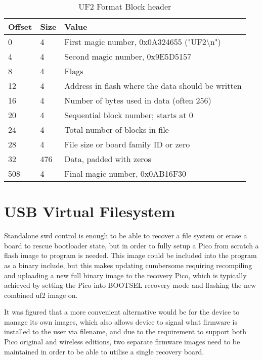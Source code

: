 {\begin{table}[h]
	\centering
	\caption{UF2 Format Block header\cite{USBFlashingFormat2023}}%
	\vspace{-16.5pt}%
	
	\begin{tabular}{|l|l|l|}
		\hline
		Offset	& Size &	Value\\ \hline
		0	& 4 &	First magic number, 0x0A324655 ("UF2\textbackslash n")\\ \hline
		4&	4&	Second magic number, 0x9E5D5157\\ \hline
		8	&4&	Flags\\ \hline
		12&	4	&Address in flash where the data should be written\\ \hline
		16&	4	&Number of bytes used in data (often 256)\\ \hline
		20&	4	&Sequential block number; starts at 0\\ \hline
		24&	4	&Total number of blocks in file\\ \hline
		28&	4	&File size or board family ID or zero\\ \hline
		32&	476&	Data, padded with zeros\\ \hline
		508&	4&	Final magic number, 0x0AB16F30\\ \hline

	\end{tabular}
	\label{table:uf2header}
\end{table}

\clearpage
\section{USB Virtual Filesystem}
Standalone \gls{swd} control is enough to be able to recover a file system or erase a board to rescue bootloader state, but in order to fully setup a Pico from scratch a flash image to program is needed. This image could be included into the program as a binary include, but this makes updating cumbersome requiring recompiling and uploading a new full binary image to the recovery Pico, which is typically achieved by setting the Pico into BOOTSEL recovery mode and flashing the new combined \gls{uf2} image on.

It was figured that a more convenient alternative would be for the device to manage its own images, which also allows device to signal what firmware is installed to the user via filename, and due to the requirement to support both Pico original and wireless editions, two separate firmware images need to be maintained in order to be able to utilise a single recovery board.

}
